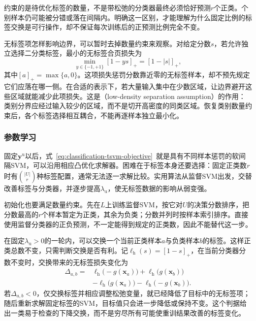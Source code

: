 约束的是待优化标签的数量，不是带松弛的分类器最终必须恰好预测$r$个正类。个别样本仍可能被分错或落在间隔内。明确这一区别，才能理解为什么固定比例的标签交换是可行操作，却不保证每次训练后的正预测比例完全不变。

无标签项怎样影响边界，可以暂时去掉数量约束来观察。对给定分数$s$，若允许独立选择二分类标签，最小的无标签合页损失为
\begin{equation}
  \label{eq:classification-tsvm-unlabeled-hinge}
  \min_{y\in\{-1,+1\}}[1-ys]_+=[1-|s|]_+,
\end{equation}
其中$[a]_+=\max\{a,0\}$。这项损失惩罚分数靠近零的无标签样本，却不预先规定它们应落在哪一侧。在合适的表示下，若大量输入集中在少数区域，让边界避开这些区域就能减少此项损失。这是（low-density separation assumption）的作用：类别分界应经过输入较少的区域，而不是切开高密度的同类区域。恢复类别数量约束后，各个标签选择相互耦合，不能再逐样本独立最小化。

\subsubsection{参数学习}
\label{sec:classification-tsvm-learning}

固定$\bm{y}^{\mathrm{u}}$以后，式~\eqref{eq:classification-tsvm-objective}~就是具有不同样本惩罚的软间隔SVM，可以沿用相应凸优化求解器。困难在于标签本身还要选择：固定正类数$r$时有$\binom{|U|}{r}$种标签配置，通常无法逐一求解比较。实用算法从监督SVM出发，交替改善标签与分类器，并逐步提高$\lambda_{\mathrm{u}}$，使无标签数据的影响从弱变强。

初始化也要满足数量约束。先在$L$上训练监督SVM，按它对$U$的决策分数排序，把分数最高的$r$个样本暂定为正类，其余为负类；分数并列时按样本索引排序。直接使用监督分类器的正负预测，不一定能得到规定的正类数，因此不能替代这一步。

在固定$\lambda_{\mathrm{u}}>0$的一轮内，可以交换一个当前正类样本$a$与负类样本$b$的标签。这样正类总数不变，只需判断交换是否有利。记$\ell_{\mathrm{h}}(s)=[1-s]_+$，在当前分类器分数不变时，交换带来的无标签损失变化为
\begin{equation}
  \label{eq:classification-tsvm-swap}
  \begin{aligned}
    \Delta_{a,b}
      ={}&\ell_{\mathrm{h}}\bigl(-g(\bm{x}_a)\bigr)
          +\ell_{\mathrm{h}}\bigl(g(\bm{x}_b)\bigr)\\
       &-\ell_{\mathrm{h}}\bigl(g(\bm{x}_a)\bigr)
          -\ell_{\mathrm{h}}\bigl(-g(\bm{x}_b)\bigr).
  \end{aligned}
\end{equation}
若$\Delta_{a,b}<0$，仅交换标签并相应调整松弛变量，就已经降低了目标中的无标签项；随后重新求解固定标签的SVM，目标值只会进一步降低或保持不变。这个判据给出一类易于检查的下降交换，而不是穷尽所有可能使重训结果改善的标签变化。

